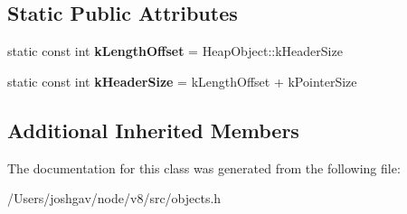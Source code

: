 \subsection*{Static Public Attributes}
\begin{DoxyCompactItemize}
\item 
static const int {\bfseries k\+Length\+Offset} = Heap\+Object\+::k\+Header\+Size\hypertarget{classv8_1_1internal_1_1_fixed_array_base_a3ef7eb2b8624eacb7386592f0d0e3412}{}\label{classv8_1_1internal_1_1_fixed_array_base_a3ef7eb2b8624eacb7386592f0d0e3412}

\item 
static const int {\bfseries k\+Header\+Size} = k\+Length\+Offset + k\+Pointer\+Size\hypertarget{classv8_1_1internal_1_1_fixed_array_base_a9cdeef0942628b14b8ec523e8898b6d1}{}\label{classv8_1_1internal_1_1_fixed_array_base_a9cdeef0942628b14b8ec523e8898b6d1}

\end{DoxyCompactItemize}
\subsection*{Additional Inherited Members}


The documentation for this class was generated from the following file\+:\begin{DoxyCompactItemize}
\item 
/\+Users/joshgav/node/v8/src/objects.\+h\end{DoxyCompactItemize}
